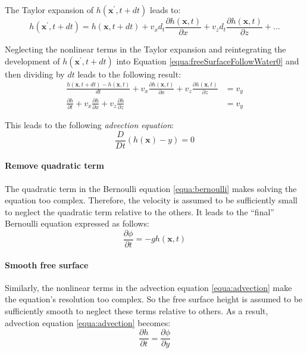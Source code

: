 \documentclass[11pt]{article}
\begin{document}
The Taylor expansion of $h(\mathbf{x^{\prime}}, t + dt)$ leads to:
\begin{equation}
	h(\mathbf{x^{\prime}}, t + dt) = h(\mathbf{x}, t + dt) + v_xd_t\frac{\partial h(\mathbf{x}, t)}{\partial x} + v_zd_t\frac{\partial h(\mathbf{x}, t)}{\partial z} + \ldots
\end{equation}

Neglecting the nonlinear terms in the Taylor expansion and reintegrating the development of $h(\mathbf{x^{\prime}}, t + dt)$ into Equation \ref{equa:freeSurfaceFollowWater0} and then dividing by $dt$ leads to the following result:
\begin{equation}
	\begin{aligned}
		\frac{h(\mathbf x, t + dt) - h(\mathbf x, t)}{dt} + v_x\frac{\partial h(\mathbf x, t)}{\partial x} + v_z\frac{\partial h(\mathbf x, t)}{\partial z} & = v_y \\
		\frac{\partial h}{\partial t} + v_x\frac{\partial h}{\partial x} + v_z\frac{\partial h}{\partial z}                                                 & = v_y
	\end{aligned}
\end{equation}

This leads to the following \emph{advection equation}:
\begin{equation}
	\frac{D}{Dt}(h(\mathbf x) - y) = 0
	\label{equa:advection}
\end{equation}

\paragraph{Remove quadratic term}
The quadratic term in the Bernoulli equation \ref{equa:bernoulli} makes solving the equation too complex.
Therefore, the velocity is assumed to be sufficiently small to neglect the quadratic term relative to the others.
It leads to the “final” Bernoulli equation expressed as follows:
\begin{equation}
	\frac{\partial \phi}{\partial t} = -gh(\mathbf x,t) \label{equa:bernoulliS}
\end{equation}

\paragraph{Smooth free surface}
Similarly, the nonlinear terms in the advection equation \ref{equa:advection} make the equation's resolution too complex.
So the free surface height is assumed to be sufficiently smooth to neglect these terms relative to others.
As a result, advection equation \ref{equa:advection} becomes:
\begin{equation}
	\frac{\partial h}{\partial t} = \frac{\partial \phi}{\partial y} \label{equa:advectionS}
\end{equation}
\end{document}
